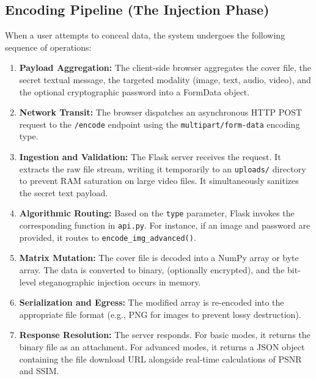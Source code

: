 \documentclass[12pt,a4paper]{report}
\begin{document}
\subsection{Encoding Pipeline (The Injection Phase)}
When a user attempts to conceal data, the system undergoes the following sequence of operations:
\begin{enumerate}
    \item \textbf{Payload Aggregation:} The client-side browser aggregates the cover file, the secret textual message, the targeted modality (image, text, audio, video), and the optional cryptographic password into a FormData object.
    \item \textbf{Network Transit:} The browser dispatches an asynchronous HTTP POST request to the \texttt{/encode} endpoint using the \texttt{multipart/form-data} encoding type.
    \item \textbf{Ingestion and Validation:} The Flask server receives the request. It extracts the raw file stream, writing it temporarily to an \texttt{uploads/} directory to prevent RAM saturation on large video files. It simultaneously sanitizes the secret text payload.
    \item \textbf{Algorithmic Routing:} Based on the \texttt{type} parameter, Flask invokes the corresponding function in \texttt{api.py}. For instance, if an image and password are provided, it routes to \texttt{encode\_img\_advanced()}.
    \item \textbf{Matrix Mutation:} The cover file is decoded into a NumPy array or byte array. The data is converted to binary, (optionally encrypted), and the bit-level steganographic injection occurs in memory.
    \item \textbf{Serialization and Egress:} The modified array is re-encoded into the appropriate file format (e.g., PNG for images to prevent lossy destruction). 
    \item \textbf{Response Resolution:} The server responds. For basic modes, it returns the binary file as an attachment. For advanced modes, it returns a JSON object containing the file download URL alongside real-time calculations of PSNR and SSIM.
\end{enumerate}
\end{document}
